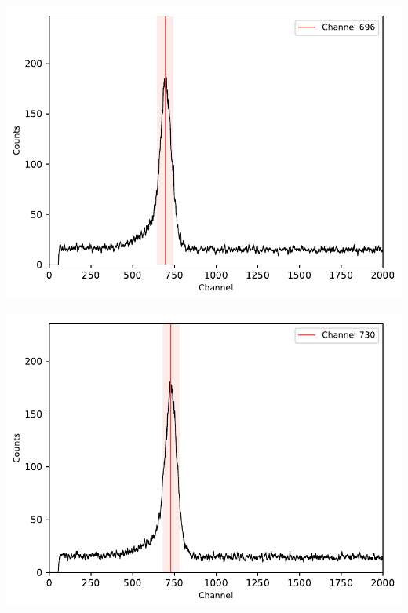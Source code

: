 \begin{multicols}{2}
\begin{center}
\begin{adjustbox}{max width=\linewidth, keepaspectratio}
        \end{adjustbox}
        \label{fig:137CsTPHC20ns}
    \end{center}
\endminipage
%
\vspace{10mm}
%
\minipage{\linewidth}
    \begin{center}
        \captionsetup{type=figure}
        \begin{adjustbox}{max width=\linewidth, keepaspectratio}
            \includegraphics[]{pdf/137CsTPHC40ns}
        \end{adjustbox}
        \label{fig:137CsTPHC40ns}
    \end{center}
\endminipage
%
\vspace{10mm}
%
\minipage{\linewidth}
    \begin{center}
        \captionsetup{type=figure}
        \begin{adjustbox}{max width=\linewidth, keepaspectratio}
            \includegraphics[]{pdf/137CsTPHC60ns}

\end{adjustbox}
\end{center}
\end{multicols}
